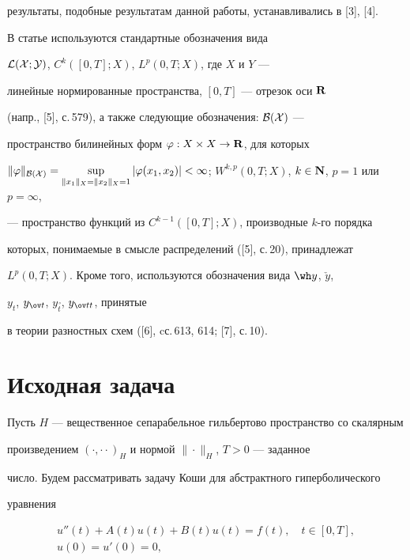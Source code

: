 результаты, подобные результатам данной работы, устанавливались в [3], [4].





В статье используются стандартные обозначения вида


$\cal L(X;Y)$, $C^k([0,T];X)$, $L^p(0,T;X)$, где $X$ и $Y$ ---


линейные нормированные пространства, $[0,T]$ --- отрезок оси ${\bold R}$


(напр., [5], с.\,579), а также следующие обозначения: $\cal B(X)$ ---


пространство билинейных форм $\varphi:X\times X\to{\bold R}$, для которых


$\|\varphi\|_{\cal B(X)}=


\sup\limits_{\|x_1\|_X=\|x_2\|_X=1}|\varphi(x_1,x_2)|


<\infty$; $W^{k,p}(0,T;X)$, $k\in{\bold N}$, $p=1$ или $p=\infty$,


--- пространство функций из $C^{k-1}([0,T];X)$, производные $k$-го порядка


которых, понимаемые в смысле распределений ([5], с.\,20), принадлежат


$L^p(0,T;X)$. Кроме того, используются обозначения вида $\wh y$, $\check y$,


$y_t$, $y_{\ov t}$, $y_{\overset{\,\circ}{t}}$, $y_{\ov tt}$, принятые


в теории разностных схем ([6], cс.\,613, 614; [7], с.\,10).





\section{Исходная задача}





Пусть $H$ --- вещественное сепарабельное гильбертово пространство со скалярным


произведением $(\cdot,\cdot\cdot)_H$ и нормой $\|\cdot\|_H$, $T>0$ --- заданное


число. Будем рассматривать задачу Коши для абстрактного гиперболического


уравнения


\begin{gather}


u''(t)+A(t)u(t)+B(t)u(t)=f(t),\quad t\in[0,T],\\


u(0)=u'(0)=0,


\end{gather}


